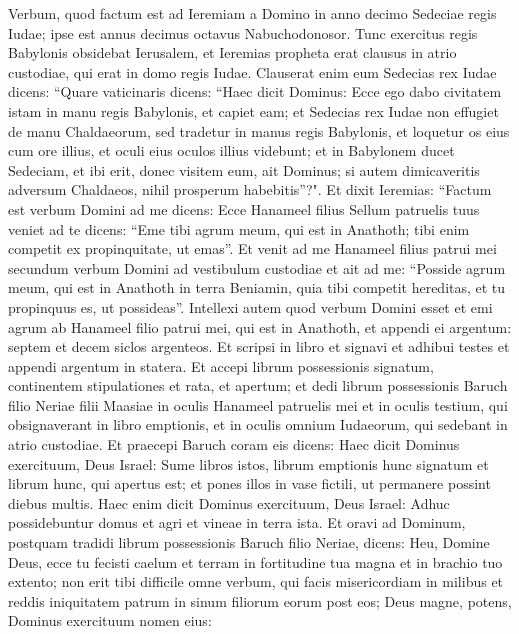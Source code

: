 \begin{biblechapter}  
\verse Verbum, quod factum est ad Ieremiam a Domino in anno decimo Sedeciae regis Iudae; ipse est annus decimus octavus Nabuchodonosor. 
\verse Tunc exercitus regis Babylonis obsidebat Ierusalem, et Ieremias propheta erat clausus in atrio custodiae, qui erat in domo regis Iudae. 
\verse Clauserat enim eum Sedecias rex Iudae dicens: “Quare vaticinaris dicens: “Haec dicit Dominus: Ecce ego dabo civitatem istam in manu regis Babylonis, et capiet eam; 
\verse et Sedecias rex Iudae non effugiet de manu Chaldaeorum, sed tradetur in manus regis Babylonis, et loquetur os eius cum ore illius, et oculi eius oculos illius videbunt; 
\verse et in Babylonem ducet Sedeciam, et ibi erit, donec visitem eum, ait Dominus; si autem dimicaveritis adversum Chaldaeos, nihil prosperum habebitis”?". 
\verse Et dixit Ieremias: “Factum est verbum Domini ad me dicens: 
\verse Ecce Hanameel filius Sellum patruelis tuus veniet ad te dicens: “Eme tibi agrum meum, qui est in Anathoth; tibi enim competit ex propinquitate, ut emas”. 
\verse Et venit ad me Hanameel filius patrui mei secundum verbum Domini ad vestibulum custodiae et ait ad me: “Posside agrum meum, qui est in Anathoth in terra Beniamin, quia tibi competit hereditas, et tu propinquus es, ut possideas”. Intellexi autem quod verbum Domini esset 
\verse et emi agrum ab Hanameel filio patrui mei, qui est in Anathoth, et appendi ei argentum: septem et decem siclos argenteos. 
\verse Et scripsi in libro et signavi et adhibui testes et appendi argentum in statera. 
\verse Et accepi librum possessionis signatum, continentem stipulationes et rata, et apertum; 
\verse et dedi librum possessionis Baruch filio Neriae filii Maasiae in oculis Hanameel patruelis mei et in oculis testium, qui obsignaverant in libro emptionis, et in oculis omnium Iudaeorum, qui sedebant in atrio custodiae. 
\verse Et praecepi Baruch coram eis dicens:  
\verse Haec dicit Dominus exercituum, Deus Israel: Sume libros istos, librum emptionis hunc signatum et librum hunc, qui apertus est; et pones illos in vase fictili, ut permanere possint diebus multis. 
\verse Haec enim dicit Dominus exercituum, Deus Israel: Adhuc possidebuntur domus et agri et vineae in terra ista. 
\verse Et oravi ad Dominum, postquam tradidi librum possessionis Baruch filio Neriae, dicens: 
\verse Heu, Domine Deus, ecce tu fecisti caelum et terram in fortitudine tua magna et in brachio tuo extento; non erit tibi difficile omne verbum, 
\verse qui facis misericordiam in milibus et reddis iniquitatem patrum in sinum filiorum eorum post eos; Deus magne, potens, Dominus exercituum nomen eius: 

\end{biblechapter}
